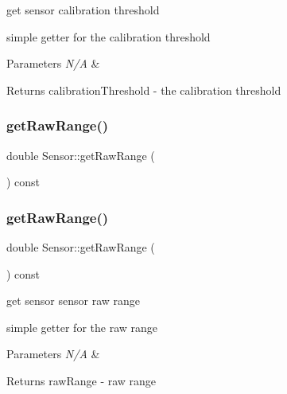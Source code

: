 get sensor calibration threshold 

simple getter for the calibration threshold


\begin{DoxyParams}{Parameters}
{\em N/A} & \\
\hline
\end{DoxyParams}
\begin{DoxyReturn}{Returns}
calibration\+Threshold -\/ the calibration threshold 
\end{DoxyReturn}
\mbox{\label{class_sensor_a6df3b3905c4a873edb3e820339d75001}} 
\subsubsection{\texorpdfstring{get\+Raw\+Range()}{getRawRange()}\hspace{0.1cm}{\footnotesize\ttfamily [1/2]}}
{\footnotesize\ttfamily double Sensor\+::get\+Raw\+Range (\begin{DoxyParamCaption}{ }\end{DoxyParamCaption}) const}

\mbox{\label{class_sensor_a6df3b3905c4a873edb3e820339d75001}} 
\subsubsection{\texorpdfstring{get\+Raw\+Range()}{getRawRange()}\hspace{0.1cm}{\footnotesize\ttfamily [2/2]}}
{\footnotesize\ttfamily double Sensor\+::get\+Raw\+Range (\begin{DoxyParamCaption}{ }\end{DoxyParamCaption}) const}



get sensor sensor raw range 

simple getter for the raw range


\begin{DoxyParams}{Parameters}
{\em N/A} & \\
\hline
\end{DoxyParams}
\begin{DoxyReturn}{Returns}
raw\+Range -\/ raw range 
\end{DoxyReturn}
\mbox{\label{class_sensor_ab173b3d269feeea488a823025d3f32a7}} 
